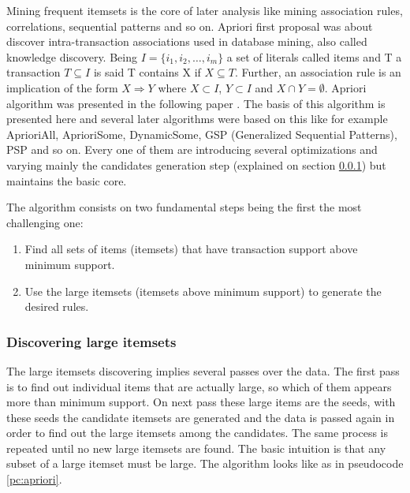 Mining frequent itemsets is the core of later analysis like mining association
rules, correlations, sequential patterns and so on. Apriori first proposal was
about discover intra-transaction associations used
in database mining, also called knowledge discovery.
Being $I=\{i_{1}, i_{2}, \dots,i_{m}\}$ a set of literals called items and T a
transaction $T \subseteq I$ is said T contains X if $X \subseteq T$. Further, an
association rule is an implication of the form $X \Rightarrow Y$ where $X
\subset I$, $Y \subset I$ and $X \cap Y = \emptyset$. Apriori algorithm was
presented in the following paper \cite{agrawalfast}. The basis of this algorithm
is presented here and several later algorithms were based on this like for
example AprioriAll, AprioriSome, DynamicSome, GSP (Generalized Sequential
Patterns), PSP and so on. Every one of them are introducing several
optimizations and varying mainly the candidates generation step (explained on
section \ref{ss:discovering_large_itemsets}) but maintains 
the basic core.

The algorithm consists on two fundamental steps being the first the most
challenging one:
\begin{enumerate}
  \item Find all sets of items (itemsets) that have transaction support above
    minimum support.
  \item Use the large itemsets (itemsets above minimum support) to generate the
    desired rules.
\end{enumerate}

\subsubsection{Discovering large itemsets}\label{ss:discovering_large_itemsets}

The large itemsets discovering implies several passes over the data. The first
pass is to find out individual items that are actually large, so which of them
appears more than minimum support. 
On next pass these large items are the seeds, with these
seeds the candidate itemsets are generated and the data is passed again in order 
to find out the large itemsets among the candidates. The same process is repeated 
until no new large itemsets are found. The basic intuition is that any subset of
a large itemset must be large. The algorithm looks like as in pseudocode
\ref{pc:apriori}.


